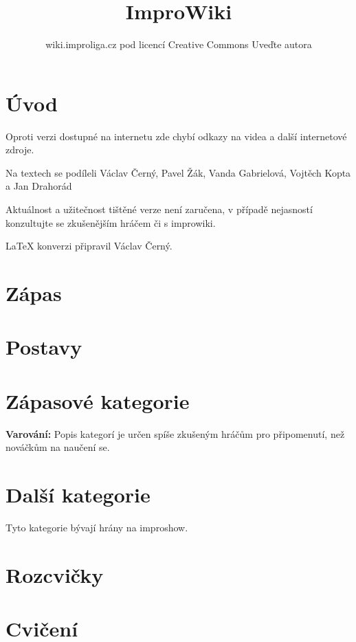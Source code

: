 \documentclass[a4paper,8pt]{book}
\title{ImproWiki}
\author{wiki.improliga.cz pod licencí Creative Commons Uveďte autora}
\begin{document}
\begin{titlepage}
\maketitle
\end{titlepage}
 
\chapter{Úvod}\label{úvod}


Oproti verzi dostupné na internetu zde chybí odkazy na videa a další internetové zdroje.

Na textech se podíleli Václav Černý, Pavel Žák, Vanda Gabrielová, Vojtěch Kopta a Jan Drahorád

Aktuálnost a užitečnost tištěné verze není zaručena, v případě nejasností konzultujte se zkušenějším hráčem či s improwiki.

\LaTeX{} konverzi připravil  Václav Černý. 
\chapter{Zápas}


\chapter{Postavy}



\chapter{Zápasové kategorie}\label{zápasové kategorie}
\textbf{Varování:} Popis kategorí je určen spíše zkušeným hráčům pro připomenutí, než nováčkům na naučení se.  


\chapter{Další kategorie}\label{další kategorie}
Tyto kategorie bývají hrány na improshow.


\chapter{Rozcvičky}\label{rozcvičky}


\chapter{Cvičení}\label{cvičení}

\end{document}
